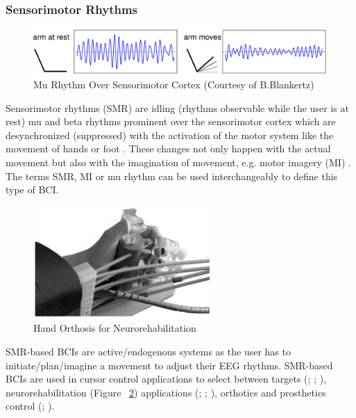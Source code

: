 \documentclass[12pt]{article}
\newcommand\mysubsubsection[1]{\subsubsection{#1}}
\numberwithin{equation}{section}
\numberwithin{figure}{section}
\numberwithin{table}{section}
\begin{document}
\mysubsubsection{Sensorimotor Rhythms}\label{seq:bci_motor}
\par{
    \begin{figure}[ht]
        \centering
        \includegraphics[scale=0.7]{images/motor_imagery}
        \caption[Mu Rhythm Over Sensorimotor Cortex]{Mu Rhythm Over Sensorimotor Cortex (Courtesy of B.Blankertz)}
        \label{fig:eeg_motor_imagery}
    \end{figure}

    Sensorimotor rhythms (SMR) are idling (rhythms observable while the
    user is at rest) mu and beta rhythms prominent over the sensorimotor cortex which are desynchronized
    (suppressed) with the activation of the motor system like the movement
    of hands or foot \citep{sellers_bcis_2010}. These changes not only happen
    with the actual movement but also with the imagination of movement, e.g. motor imagery (MI) \citep{mcfarland_braincomputer_2006}.
    The terms SMR, MI or mu rhythm can be used interchangeably to define this
    type of BCI.
}
\par{
    \begin{figure}[ht]
        \centering
        \includegraphics[width=0.6\textwidth]{images/bci_hand_rehab}
        \caption[Hand Orthosis for Neurorehabilitation]{Hand Orthosis for Neurorehabilitation \citep{ramos-murguialday_proprioceptive_2012}}
        \label{fig:motor_orthosis}
    \end{figure}

    SMR-based BCIs are active/endogenous systems as the user has to initiate/plan/imagine
    a movement to adjust their EEG rhythms. SMR-based BCIs are used in cursor control
    applications to select between targets
    (\citealp{wolpaw_eeg-based_1991}; \citealp{wolpaw_wadsworth_2003}; \citealp{vaughan_wadsworth_2006}),
    neurorehabilitation (Figure ~\ref{fig:motor_orthosis}) applications (\citealp{prasad_using_2009}; \citealp{ramos-murguialday_proprioceptive_2012};
    \citealp{ortner_human-computer_2013}), orthotics and prosthetics control (\citealp{guger_prosthetic_1999}; \citealp{pfurtscheller_motor_2001}).
}
\end{document}
